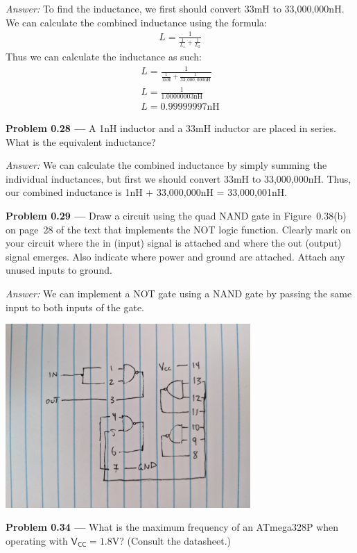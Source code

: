\documentclass[11pt]{article}
\newcommand{\problem}[1]{\textbf{Problem #1 ---} }
\newcommand{\answer}{\textit{Answer: } }
\begin{document}
\answer To find the inductance, we first should convert 33\si{\milli\henry} to 33,000,000\si{\nano\henry}.
We can calculate the combined inductance using the formula:
\begin{align*}
L = \frac{1}{\frac{1}{L_1}+\frac{1}{L_2}}
\end{align*}
Thus we can calculate the inductance as such:
\begin{align*}
L = \frac{1}{\frac{1}{1\si{\nano\henry}}+\frac{1}{33,000,000\si{\nano\henry}}}\\
L = \frac{1}{1.00000003\si{\nano\henry}}\\
L = 0.99999997\si{\nano\henry}
\end{align*}
 
\problem{0.28} A 1\si{\nano\henry} inductor and a 33\si{\milli\henry}
  inductor are placed in series.  What is the equivalent inductance?

\answer We can calculate the combined inductance by simply summing the individual inductances, but first we should convert
33\si{\milli\henry} to 33,000,000\si{\nano\henry}. Thus, our combined inductance is 1\si{\nano\henry} + 33,000,000\si{\nano\henry} = 33,000,001\si{\nano\henry}.

\problem{0.29} Draw a circuit using the quad NAND gate in
  Figure~0.38(b) on page~28 of the text that
  implements the NOT logic function.  Clearly mark on your circuit where
  the \textsf{in} (input) signal is attached and where the \textsf{out}
  (output) signal emerges.  Also indicate where power and ground are
  attached.  Attach any unused inputs to ground.

\answer We can implement a NOT gate using a NAND gate by passing the same input to both inputs of the gate.
\begin{center}
\includegraphics[width=0.7\textwidth]{problem29.jpg}
\end{center}
\problem{0.34} What is the maximum frequency of an ATmega328P when operating
  with $\mathsf{V_{CC}} = 1.8\si{\volt}$? (Consult the datasheet.)
\end{document}
